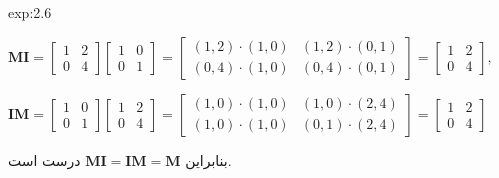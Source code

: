 {\begin{spacing}{1.5}
\begin{example}{exp:2.6}
            \begin{center}
                $\textbf{MI}=\begin{bmatrix}
                                 1 & 2 \\
                                 0 & 4
                \end{bmatrix}\begin{bmatrix}
                                 1 & 0 \\
                                 0 & 1
                \end{bmatrix}=\begin{bmatrix}
                (1,2)
                                  \cdot(1,0)      & (1,2)\cdot(0,1) \\
                                  (0,4)\cdot(1,0) & (0,4)\cdot(0,1)
                \end{bmatrix}=\begin{bmatrix}
                                  1 & 2 \\
                                  0 & 4
                \end{bmatrix},$
            \end{center}
            \begin{center}
                $\textbf{IM}=\begin{bmatrix}
                                 1 & 0 \\
                                 0 & 1
                \end{bmatrix}\begin{bmatrix}
                                 1 & 2 \\
                                 0 & 4
                \end{bmatrix}=\begin{bmatrix}
                (1,0)
                                  \cdot(1,0)      & (1,0)\cdot(2,4) \\
                                  (1,0)\cdot(1,0) & (0,1)\cdot(2,4)
                \end{bmatrix}=\begin{bmatrix}
                                  1 & 2 \\
                                  0 & 4
                \end{bmatrix}$
            \end{center}

            بنابراین $\textbf{MI}=\textbf{IM}=\textbf{M}$ درست است.
        \end{example}


\end{spacing}}
